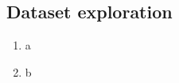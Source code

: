 \documentclass[11pt,a4paper,titlepage]{article}
\begin{document}
\subsection{Dataset exploration}
\begin{enumerate}
    \item a
    \item b
\end{enumerate}


\end{document}
